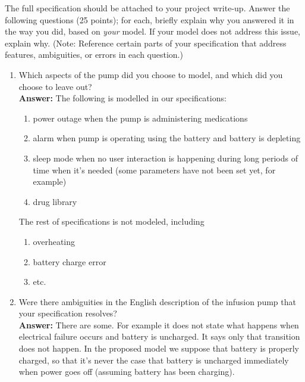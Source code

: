 \documentclass{article}
\begin{document}
\noindent The full specification should be attached to your project
write-up. Answer the following questions (25 points); for each,
briefly explain why you answered it in the way you did, based on
\emph{your} model. If your model does not address this issue,
explain why. (Note: Reference certain parts of your specification that address features, ambiguities, or errors in each question.)

\begin{enumerate}
    \item Which aspects of the pump did you choose to model, and which did you choose to leave out? \\
    \textbf{Answer:} The following is modelled in our specifications:
    \begin{enumerate}
        \item power outage when the pump is administering medications
        \item alarm when pump is operating using the battery and battery is depleting
        \item sleep mode when no user interaction is happening during long periods of time when it's needed (some parameters have not been set yet, for example)
        \item drug library
    \end{enumerate}
    The rest of specifications is not modeled, including
    \begin{enumerate}
        \item overheating
        \item battery charge error
        \item etc.
    \end{enumerate}
    \item Were there ambiguities in the English description of the infusion pump that your specification resolves?\\
    \textbf{Answer:} There are some. For example it does not state what happens when electrical failure occurs and battery is uncharged. It says only that transition does not happen. In the proposed model we suppose that battery is properly charged, so that it's never the case that battery is uncharged immediately when power goes off (assuming battery has been charging).
    

\end{enumerate}
\end{document}
